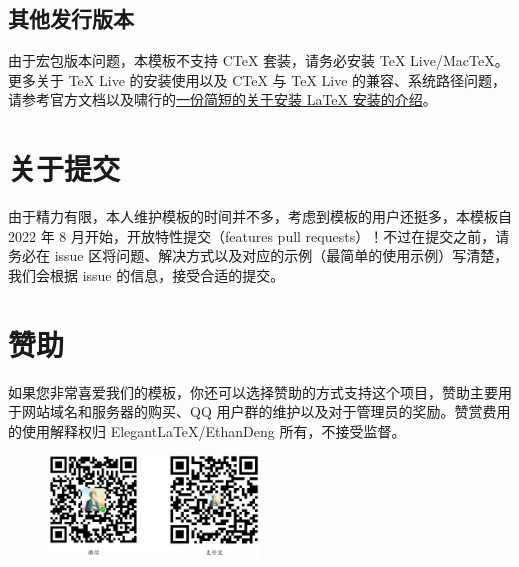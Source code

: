 \subsection{其他发行版本}

由于宏包版本问题，本模板不支持 C\TeX{} 套装，请务必安装 TeX Live/Mac\TeX{}。更多关于 \TeX{} Live 的安装使用以及 C\TeX{} 与 \TeX{} Live 的兼容、系统路径问题，请参考官方文档以及啸行的\href{https://github.com/OsbertWang/install-latex-guide-zh-cn/releases/}{一份简短的关于安装 \LaTeX{} 安装的介绍}。


\section{关于提交}

由于精力有限，本人维护模板的时间并不多，考虑到模板的用户还挺多，本模板自 2022 年 8 月开始，开放特性提交（features pull requests）！不过在提交之前，请务必在 issue 区将问题、解决方式以及对应的示例（最简单的使用示例）写清楚，我们会根据 issue 的信息，接受合适的提交。


\section{赞助}

如果您非常喜爱我们的模板，你还可以选择赞助的方式支持这个项目，赞助主要用于网站域名和服务器的购买、QQ 用户群的维护以及对于管理员的奖励。赞赏费用的使用解释权归 ElegantLaTeX/EthanDeng 所有，不接受监督。

\begin{figure}[htbp]
  \centering
  \includegraphics[width=0.5\textwidth]{../image/donate.jpg}
\end{figure}
  